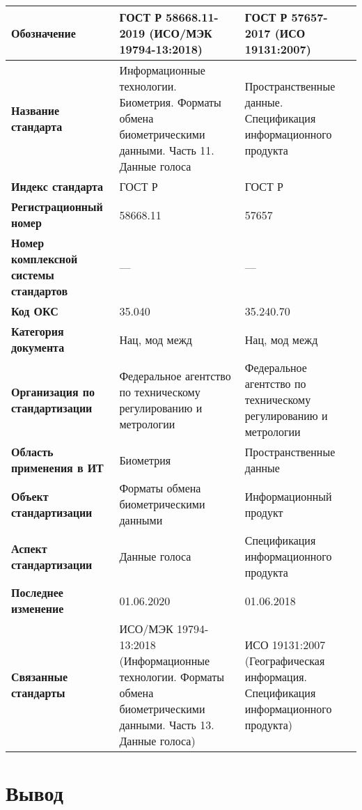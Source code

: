 \begin{table}[h!tp]
	\centering
	\caption{}
	\label{table:national:international:mod}
	\begin{tabular}{|p{10em}|p{12em}|p{12em}|}
		\hline
		\textbf{Обозначение}
			& \textbf{ГОСТ Р 58668.11-2019 (ИСО/МЭК 19794-13:2018)}
			& \textbf{ГОСТ Р 57657-2017 (ИСО 19131:2007)} \\ \hline
		\textbf{Название стандарта}
			& Информационные технологии. Биометрия.
			Форматы обмена биометрическими данными. Часть 11. Данные голоса
			& Пространственные данные.
			Спецификация информационного продукта \\ \hline
		\textbf{Индекс стандарта}
			& ГОСТ Р & ГОСТ Р \\ \hline
		\textbf{Регистрационный номер}
			& 58668.11 & 57657 \\ \hline
		\textbf{Номер комплексной системы стандартов}
			& --- & --- \\ \hline
		\textbf{Код ОКС}
			& 35.040 & 35.240.70 \\ \hline
		\textbf{Категория документа}
			& Нац, мод межд & Нац, мод межд \\ \hline
		\textbf{Организация по стандартизации}
			& Федеральное агентство по техническому регулированию и метрологии
			& Федеральное агентство по техническому регулированию и метрологии \\ \hline
		\textbf{Область применения в ИТ}
			& Биометрия & Пространственные данные \\ \hline
		\textbf{Объект стандартизации}
			& Форматы обмена биометрическими данными
			& Информационный продукт \\ \hline
		\textbf{Аспект стандартизации}
			& Данные голоса & Спецификация информационного продукта \\ \hline
		\textbf{Последнее изменение}
			& 01.06.2020 & 01.06.2018 \\ \hline
		\textbf{Связанные стандарты}
			& ИСО/МЭК 19794-13:2018 (Информационные технологии.
			Форматы обмена биометрическими данными. Часть 13. Данные голоса)
			& ИСО 19131:2007 (Географическая информация.
			Спецификация информационного продукта) \\ \hline
	\end{tabular}
\end{table}

\clearpage

\section*{\LARGE Вывод}

